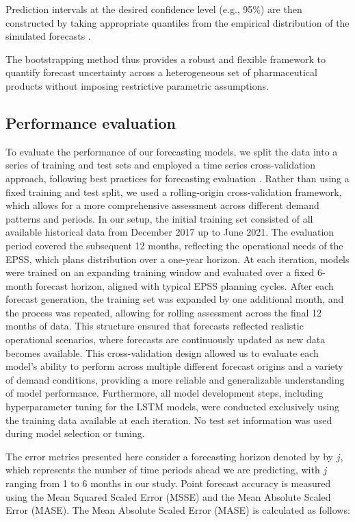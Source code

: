\documentclass[
  authoryear,
  preprint,
  3p]{elsarticle}
\begin{document}
Prediction intervals at the desired confidence level (e.g., 95\%) are
then constructed by taking appropriate quantiles from the empirical
distribution of the simulated forecasts \citep{hyndman2021forecasting}.

The bootstrapping method thus provides a robust and flexible framework
to quantify forecast uncertainty across a heterogeneous set of
pharmaceutical products without imposing restrictive parametric
assumptions.

\subsection{Performance evaluation}\label{performance-evaluation}

To evaluate the performance of our forecasting models, we split the data
into a series of training and test sets and employed a time series
cross-validation approach, following best practices for forecasting
evaluation \citep{hyndman2021forecasting}. Rather than using a fixed
training and test split, we used a rolling-origin cross-validation
framework, which allows for a more comprehensive assessment across
different demand patterns and periods. In our setup, the initial
training set consisted of all available historical data from December
2017 up to June 2021. The evaluation period covered the subsequent 12
months, reflecting the operational needs of the EPSS, which plans
distribution over a one-year horizon. At each iteration, models were
trained on an expanding training window and evaluated over a fixed
6-month forecast horizon, aligned with typical EPSS planning cycles.
After each forecast generation, the training set was expanded by one
additional month, and the process was repeated, allowing for rolling
assessment across the final 12 months of data. This structure ensured
that forecasts reflected realistic operational scenarios, where
forecasts are continuously updated as new data becomes available. This
cross-validation design allowed us to evaluate each model's ability to
perform across multiple different forecast origins and a variety of
demand conditions, providing a more reliable and generalizable
understanding of model performance. Furthermore, all model development
steps, including hyperparameter tuning for the LSTM models, were
conducted exclusively using the training data available at each
iteration. No test set information was used during model selection or
tuning.

The error metrics presented here consider a forecasting horizon denoted
by by \(j\), which represents the number of time periods ahead we are
predicting, with \(j\) ranging from 1 to 6 months in our study. Point
forecast accuracy is measured using the Mean Squared Scaled Error (MSSE)
and the Mean Absolute Scaled Error (MASE). The Mean Absolute Scaled
Error (MASE) \citep{HK06, hyndman2021forecasting} is calculated as
follows:
\end{document}
